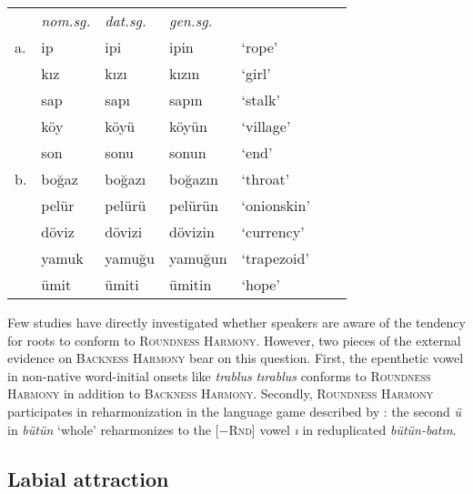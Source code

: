 \begin{example}
\begin{tabular}{lllllll}
   & \emph{nom.sg.} & \emph{dat.sg.} & \emph{gen.sg.}  \\
a. & {ip}           & {ipi}          & {ipin}         & `rope' & \citep[][216]{Clements1982} \\
   & {kız}          & {kızı}         & {kızın}        & `girl'    \\
   & {sap}          & {sapı}         & {sapın}        & `stalk'  \\
   & {köy}          & {köyü}         & {köyün}        & `village' \\
   & {son}          & {sonu}         & {sonun}        & `end'     \\
b. & {boğaz}        & {boğazı}       & {boğazın}      & `throat'  & \citep{TELL} \\
   & {pelür}        & {pelürü}       & {pelürün}      & `onionskin' \\
   & {döviz}        & {dövizi}       & {dövizin}      & `currency'  \\
   & {yamuk}        & {yamuğu}       & {yamuğun}      & `trapezoid' \\
   & {ümit}         & {ümiti}        & {ümitin}       & `hope'      \\
\end{tabular}
\end{example}

Few studies have directly investigated whether speakers are aware of the tendency for roots to conform to \textsc{Roundness Harmony}. However, two pieces of the external evidence on \textsc{Backness Harmony} bear on this question. First, the epenthetic vowel in non-native word-initial onsets like \emph{trablus} \alt{} \emph{tırablus} conforms to \textsc{Roundness Harmony} in addition to \textsc{Backness Harmony}. Secondly, \textsc{Roundness Harmony} participates in reharmonization in the language game described by \citeauthor{Harrison2001}: the second \emph{ü} in \emph{bütün} `whole' reharmonizes to the [$-$\textsc{Rnd}] vowel \emph{ı} in reduplicated \emph{bütün-batın}.

\subsection{Labial attraction}

